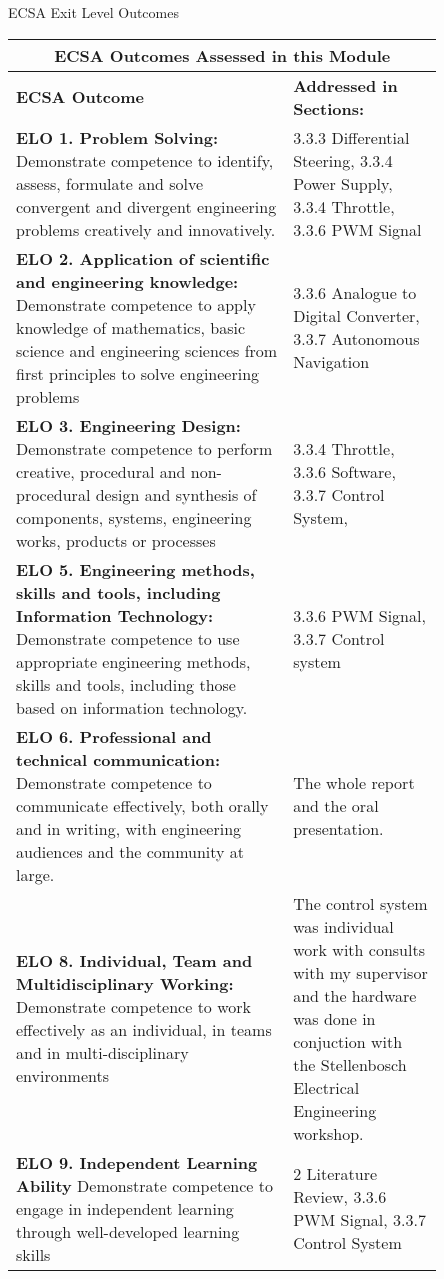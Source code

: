 \begin{Summary}{ECSA Exit Level Outcomes}
\begin{tabular}{|p{0.55\linewidth}|p{0.3\linewidth}|}
	\hline
	\multicolumn{2}{|c|}{\textbf{ECSA Outcomes Assessed in this Module}} \\
	\hline
	\textbf{ECSA Outcome} & \textbf{Addressed in Sections:} \\
	\hline
	\textbf{ELO 1. Problem Solving:} Demonstrate competence to identify, assess, formulate and solve convergent and divergent engineering problems creatively and innovatively. & 3.3.3 Differential Steering, 3.3.4 Power Supply, 3.3.4 Throttle, 3.3.6 PWM Signal \\%
	\hline
	\textbf{ELO 2. Application of scientific and engineering knowledge:} Demonstrate
	competence to apply knowledge of mathematics,
	basic science and engineering sciences from first
	principles to solve engineering problems & 3.3.6 Analogue to Digital Converter, 3.3.7 Autonomous Navigation\\%
	\hline
	\textbf{ELO 3. Engineering Design:} Demonstrate
	competence to perform creative, procedural and
	non-procedural design and synthesis of
	components, systems, engineering works,
	products or processes& 3.3.4 Throttle, 3.3.6 Software, 3.3.7 Control System,\\%
	\hline
	\textbf{ELO 5. Engineering methods, skills and tools,
		including Information Technology:} Demonstrate competence to use appropriate
	engineering methods, skills and tools, including
those based on information technology. & 3.3.6 PWM Signal, 3.3.7 Control system \\%
	\hline
	\textbf{ELO 6. Professional and technical
		communication: } Demonstrate competence to
	communicate effectively, both orally and in
writing, with engineering audiences and the
community at large. & The whole report and the oral presentation.\\%
	\hline
	\textbf{ELO 8. Individual, Team and
		Multidisciplinary Working:} Demonstrate
	competence to work effectively as an individual,
in teams and in multi-disciplinary environments & The control system was individual work with consults with my supervisor and the hardware was done in conjuction with the Stellenbosch Electrical Engineering workshop.\\%
	\hline
	\textbf{ELO 9. Independent Learning Ability} Demonstrate competence to engage in
	independent learning through well-developed
	learning skills& 2 Literature Review, 3.3.6 PWM Signal, 3.3.7 Control System\\%
	\hline
	\end{tabular}
\end{Summary}